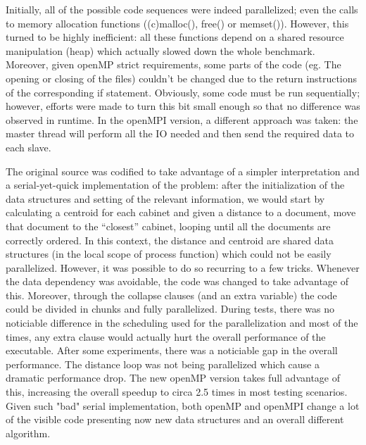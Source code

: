\documentclass[times, 10pt,twocolumn]{article}
\begin{document}
Initially, all of the possible code sequences were indeed parallelized; even the calls to memory allocation functions ((c)malloc(), free() or memset()). However, this turned to be highly inefficient: all these functions depend on a shared resource manipulation (heap) which actually slowed down the whole benchmark. Moreover, given openMP strict requirements, some parts of the code (eg. The opening or closing of the files) couldn't be changed due to the return instructions of the corresponding if statement. Obviously, some code must be run sequentially; however, efforts were made to turn this bit small enough so that no difference was observed in runtime. In the openMPI version, a different approach was taken: the master thread will perform all the IO needed and then send the required data to each slave.

	The original source was codified to take advantage of a simpler interpretation and a serial-yet-quick implementation of the problem: after the initialization of the data structures and setting of the relevant information, we would start by calculating a centroid for each cabinet and given a distance to a document, move that document to the “closest” cabinet, looping until all the documents are correctly ordered. In this context, the distance and centroid are shared data structures (in the local scope of process function) which could not be easily parallelized. However, it was possible to do so recurring to a few tricks. Whenever the data dependency was avoidable, the code was changed to take advantage of this. Moreover, through the collapse clauses (and an extra variable) the code could be divided in chunks and fully parallelized. During tests, there was no noticiable difference in the scheduling used for the parallelization and most of the times, any extra clause would actually hurt the overall performance of the executable. After some experiments, there was a noticiable gap in the overall performance. The distance loop was not being parallelized which cause a dramatic performance drop. The new openMP version takes full advantage of this, increasing the overall speedup to circa 2.5 times in most testing scenarios. Given such "bad" serial implementation, both openMP and openMPI change a lot of the visible code presenting now new data structures and an overall different algorithm.
\end{document}

